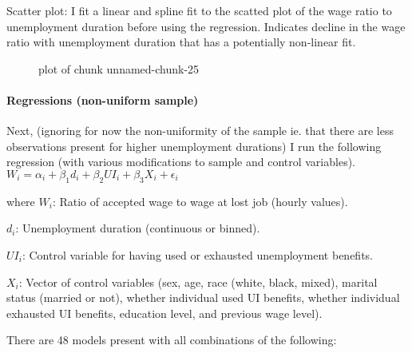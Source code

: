 Scatter plot: I fit a linear and spline fit to the scatted plot of the
wage ratio to unemployment duration before using the regression.
Indicates decline in the wage ratio with unemployment duration that has
a potentially non-linear fit.


\begin{figure}
\centering
{}
\caption{plot of chunk unnamed-chunk-25}
\end{figure}

\paragraph{Regressions (non-uniform
sample)}\label{regressions-non-uniform-sample}

Next, (ignoring for now the non-uniformity of the sample ie. that there
are less observations present for higher unemployment durations) I run
the following regression (with various modifications to sample and
control variables).
\(W_{i} = \alpha_{i} + \beta_{1} d_{i} + \beta_{2}UI_{i} + \beta_{3}X_{i} + \epsilon_{i}\)

where \(W_{i}\): Ratio of accepted wage to wage at lost job (hourly
values).

\(d_{i}\): Unemployment duration (continuous or binned).

\(UI_{i}\): Control variable for having used or exhausted unemployment
benefits.

\(X_{i}\): Vector of control variables (sex, age, race (white, black,
mixed), marital status (married or not), whether individual used UI
benefits, whether individual exhausted UI benefits, education level, and
previous wage level).

There are 48 models present with all combinations of the following:

